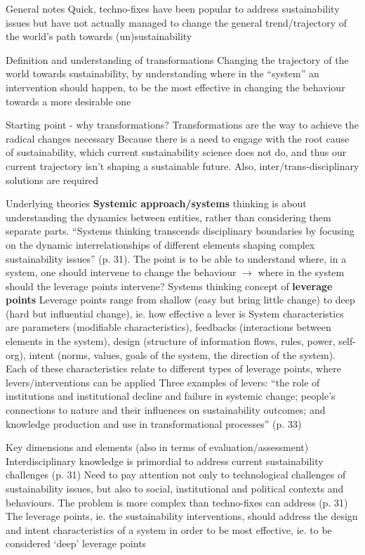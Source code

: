\documentclass{article}
\begin{document}
\begin{outline}
	\1 General notes
		\2 Quick, techno-fixes have been popular to address sustainability issues but have not actually managed to change the general trend/trajectory of the world's path towards (un)sustainability
	
	\1 Definition and understanding of transformations
		\2 Changing the trajectory of the world towards sustainability, by understanding where in the ``system'' an intervention should happen, to be the most effective in changing the behaviour towards a more desirable one
	
	\1 Starting point - why transformations?
		\2 Transformations are the way to achieve the radical changes necessary
		\2 Because there is a need to engage with the root cause of sustainability, which current sustainability science does not do, and thus our current trajectory isn't shaping a sustainable future. Also, inter/trans-disciplinary solutions are required
	
	\1 Underlying theories
		\2 \textbf{Systemic approach/systems} thinking is about understanding the dynamics between entities, rather than considering them separate parts. ``Systems thinking transcends disciplinary boundaries by focusing on the dynamic interrelationships of different elements shaping complex sustainability issues'' (p. 31). The point is to be able to understand where, in a system, one should intervene to change the behaviour $\rightarrow$ where in the system should the leverage points intervene?
		\2 Systems thinking concept of \textbf{leverage points}
			\3 Leverage points range from shallow (easy but bring little change) to deep (hard but influential change), ie. how effective a lever is
			\3 System characteristics are parameters (modifiable characteristics), feedbacks (interactions between elements in the system), design (structure of information flows, rules, power, self-org), intent (norms, values, goals of the system, the direction of the system). Each of these characteristics relate to different types of leverage points, where levers/interventions can be applied
			\3 Three examples of levers: ``the role of institutions and institutional decline and failure in systemic change; people's connections to nature and their influences on sustainability outcomes; and knowledge production and use in transformational processes'' (p. 33)
			
			
	\1 Key dimensions and elements (also in terms of evaluation/assessment)
		\2 Interdisciplinary knowledge is primordial to address current sustainability challenges (p. 31)
		\2 Need to pay attention not only to technological challenges of sustainability issues, but also to social, institutional and political contexts and behaviours. The problem is more complex than techno-fixes can address (p. 31)
		\2 The leverage points, ie. the sustainability interventions, should address the design and intent characteristics of a system in order to be most effective, ie. to be considered `deep' leverage points
\end{outline}

\printbibliography
\end{document}
